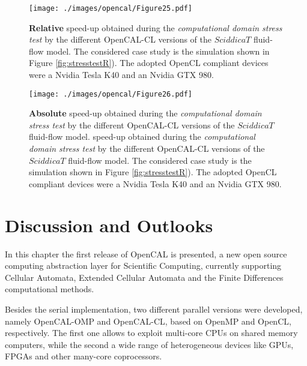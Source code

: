 \begin{figure}
	\begin{center}
		\texttt{[image: ./images/opencal/Figure25.pdf]}
		\caption[\textbf{Relative} speed-up obtained during the \emph{computational domain
			stress test} by the different OpenCAL-CL versions of the $SciddicaT$
		fluid-flow model.]{\textbf{Relative} speed-up obtained during the \emph{computational domain
				stress test} by the different OpenCAL-CL versions of the $SciddicaT$
			fluid-flow model. The considered case study is the simulation shown in
			Figure \ref{fig:stresstestR}). The adopted OpenCL compliant devices
			were a Nvidia Tesla K40 and an Nvidia GTX 980.}
		\label{gr:sciddicaT-CL-relative-speed-up-stressR}
	\end{center}
\end{figure}

\begin{figure}
	\begin{center}
		\texttt{[image: ./images/opencal/Figure26.pdf]}
		\caption[\textbf{Absolute} speed-up obtained during the \emph{computational domain
			stress test} by the different OpenCAL-CL versions of the $SciddicaT$
		fluid-flow model.]{\textbf{Absolute} speed-up obtained during the \emph{computational domain
				stress test} by the different OpenCAL-CL versions of the $SciddicaT$
			fluid-flow model. speed-up obtained during the \emph{computational domain
				stress test} by the different OpenCAL-CL versions of the $SciddicaT$
			fluid-flow model. The considered case study is the simulation shown in
			Figure \ref{fig:stresstestR}). The adopted OpenCL compliant devices
			were a Nvidia Tesla K40 and an Nvidia GTX 980.}
		\label{gr:sciddicaT-CL-absolute-speed-up-stressR}
	\end{center}
\end{figure}

\section{Discussion and Outlooks}

In this chapter the first release of OpenCAL is presented, a new
open source computing abstraction layer for Scientific Computing,
currently supporting Cellular Automata, Extended Cellular Automata
and the Finite Differences computational methods.

Besides the serial implementation, two different parallel versions
were developed, namely OpenCAL-OMP and OpenCAL-CL, based on OpenMP
and OpenCL, respectively. The first one allows to exploit multi-core
CPUs on shared memory computers, while the second a wide range of
heterogeneous devices like GPUs, FPGAs and other many-core
coprocessors.

